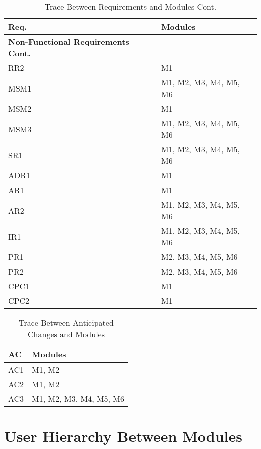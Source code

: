 \documentclass[12pt, titlepage]{article}
\begin{document}
\begin{table}[H]
    \centering
    \begin{tabular}{p{} p{}}
        \toprule
        \textbf{Req.} & \textbf{Modules}\\
        \midrule
        \textbf{Non-Functional Requirements Cont.}\\     
        RR2 & M1 \\
        MSM1 & M1, M2, M3, M4, M5, M6 \\
        MSM2 & M1 \\
        MSM3 & M1, M2, M3, M4, M5, M6 \\
        SR1 & M1, M2, M3, M4, M5, M6 \\
        ADR1 & M1 \\
        AR1 & M1 \\
        AR2 & M1, M2, M3, M4, M5, M6 \\
        IR1 & M1, M2, M3, M4, M5, M6 \\
        PR1 & M2, M3, M4, M5, M6 \\
        PR2 & M2, M3, M4, M5, M6 \\
        CPC1 & M1 \\
        CPC2 & M1 \\
        \bottomrule
    \end{tabular}
    \caption{Trace Between Requirements and Modules Cont.}
\end{table}

\begin{table}[H]
    \centering
    \begin{tabular}{p{} p{}}
        \toprule
        \textbf{AC} & \textbf{Modules}\\
        \midrule
            AC1 & M1, M2 \\
            AC2 & M1, M2 \\
            AC3 & M1, M2, M3, M4, M5, M6 \\
        \bottomrule
    \end{tabular}
    \caption{Trace Between Anticipated Changes and Modules}
\end{table}

\section{User Hierarchy Between Modules}
\end{document}

